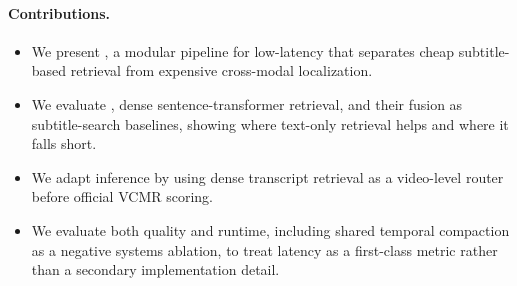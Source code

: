 \paragraph{Contributions.}
\begin{itemize}[leftmargin=*]
  \item We present \system, a modular pipeline for low-latency \task that separates cheap subtitle-based retrieval from expensive cross-modal localization.
  \item We evaluate \bm, dense sentence-transformer retrieval, and their fusion as subtitle-search baselines, showing where text-only retrieval helps and where it falls short.
  \item We adapt \xml inference by using dense transcript retrieval as a video-level router before official VCMR scoring.
  \item We evaluate both quality and runtime, including shared temporal compaction as a negative systems ablation, to treat latency as a first-class metric rather than a secondary implementation detail.
\end{itemize}
